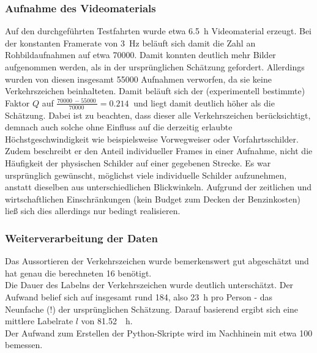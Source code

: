 \documentclass[12pt,a4paper,ngerman,enabledeprecatedfontcommands]{scrreprt}
\begin{document}
\subsubsection*{Aufnahme des Videomaterials}
Auf den durchgeführten Testfahrten wurde etwa \SI{6.5}{\hour} Videomaterial erzeugt. Bei der konstanten Framerate von \SI{3}{\hertz} beläuft sich damit die Zahl an Rohbildaufnahmen auf etwa \SI{70000}{}. Damit konnten deutlich mehr Bilder aufgenommen werden, als in der ursprünglichen Schätzung gefordert. Allerdings wurden von diesen insgesamt \SI{55000}{} Aufnahmen verworfen, da sie keine Verkehrszeichen beinhalteten. Damit beläuft sich der (experimentell bestimmte) Faktor $Q$ auf $\frac{\SI{70000}{} - \SI{55000}{}}{\SI{70000}{}} = \SI{0.214}{}$ und liegt damit deutlich höher als die Schätzung. Dabei ist zu beachten, dass dieser alle Verkehrszeichen berücksichtigt, demnach auch solche ohne Einfluss auf die derzeitig erlaubte Höchstgeschwindigkeit wie beispielsweise Vorwegweiser oder Vorfahrtsschilder. Zudem beschreibt er den Anteil individueller Frames in einer Aufnahme, nicht die Häufigkeit der physischen Schilder auf einer gegebenen Strecke. Es war ursprünglich gewünscht, möglichst viele individuelle Schilder aufzunehmen, anstatt dieselben aus unterschiedlichen Blickwinkeln. Aufgrund der zeitlichen und wirtschaftlichen Einschränkungen (kein Budget zum Decken der Benzinkosten) ließ sich dies allerdings nur bedingt realisieren.\\

\subsubsection*{Weiterverarbeitung der Daten}
Das Aussortieren der Verkehrszeichen wurde bemerkenswert gut abgeschätzt und hat genau die berechneten \SI{16}{\PS} benötigt.\\
Die Dauer des Labelns der Verkehrszeichen wurde deutlich unterschätzt. Der Aufwand belief sich auf insgesamt rund \SI{184}{\PS}, also \SI{23}{\hour} pro Person - das Neunfache (!) der ursprünglichen Schätzung. Darauf basierend ergibt sich eine mittlere Labelrate $l$ von \SI{81.52}{\per\hour}.\\

Der Aufwand zum Erstellen der Python-Skripte wird im Nachhinein mit etwa \SI{100}{\PS} bemessen.\\
\end{document}
